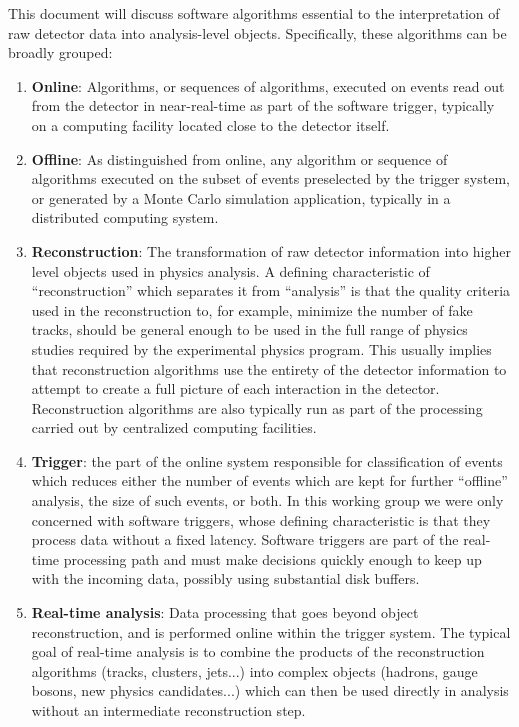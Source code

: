 This document will discuss software algorithms essential to the interpretation of raw detector data into analysis-level objects. Specifically, these algorithms can be broadly grouped: 
\begin{enumerate}
\item
{\bf Online}: Algorithms, or sequences of algorithms, executed on events read out from the detector in near-real-time as part of the software trigger, typically on a computing facility located close to the detector itself.
\item
{\bf Offline}: As distinguished from online, any algorithm or sequence of algorithms executed on the subset of events preselected by the trigger system, or generated by a Monte Carlo simulation application, typically in a distributed computing system.
\item
{\bf Reconstruction}: The transformation of raw detector information into higher level objects used in physics analysis. A defining characteristic of “reconstruction” which separates it from “analysis” is that the quality criteria used in the reconstruction to, for example, minimize the number of fake tracks, should be general enough to be used in the full range of physics studies required by the experimental physics program. This usually implies that reconstruction algorithms use the entirety of the detector information to attempt to create a full picture of each interaction in the detector. Reconstruction algorithms are also typically run as part of the processing carried out by centralized computing facilities.
\item
{\bf Trigger}: the part of the online system responsible for classification of events which reduces either the number of events which are kept for further “offline” analysis, the size of such events, or both. In this working group we were only concerned with software triggers, whose defining characteristic is that they process data without a fixed latency. Software triggers are part of the real-time processing path and must make decisions quickly enough to keep up with the incoming data, possibly using substantial disk buffers.
\item
{\bf Real-time analysis}: Data processing that goes beyond object reconstruction, and is performed online within the trigger system. The typical goal of real-time analysis is to combine the products of the reconstruction algorithms (tracks, clusters, jets...) into complex objects (hadrons, gauge bosons, new physics candidates...) which can then be used directly in analysis without an intermediate reconstruction step. 
\end{enumerate}

